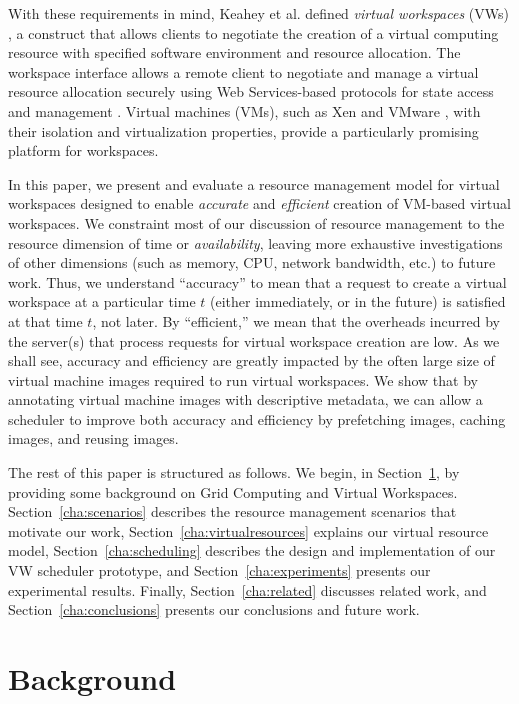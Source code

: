 \documentclass[singlespace]{ccw_chithesis}
\begin{document}
With these requirements in mind, Keahey et al. defined \emph{virtual workspaces} (VWs) \cite{VirtualWorkspaces05}, a construct that allows clients to negotiate the creation of a virtual computing resource with specified software environment and resource allocation. The workspace interface allows a remote client to negotiate and manage a virtual resource allocation securely using Web Services{}-based protocols for state access and management \cite{ModelingState05}. Virtual machines (VMs), such as Xen \cite{xen} and VMware \cite{vmwareweb}, with their isolation and virtualization properties, provide a
particularly promising platform for workspaces.

In this paper, we present and evaluate a resource management model for virtual workspaces designed to enable \emph{accurate} and \emph{efficient} creation of VM{}-based virtual workspaces. We constraint most of our discussion of resource management to the resource dimension of time or \emph{availability}, leaving more exhaustive investigations of other dimensions (such as memory, CPU, network bandwidth, etc.) to future work. Thus, we understand ``accuracy'' to mean that a request to create a virtual workspace at a particular time $t$ (either immediately, or in the future) is satisfied at that time $t$, not later. By ``efficient,'' we mean that the overheads incurred by the server(s) that process requests for virtual workspace creation are low. As we shall see, accuracy and efficiency are greatly impacted by the often large size of virtual machine images required to run virtual workspaces. We show that by annotating virtual machine images with descriptive metadata, we can allow a scheduler to improve both accuracy and efficiency by prefetching images, caching images, and reusing images.

The rest of this paper is structured as follows. We begin, in Section~\ref{cha:background}, by providing some background on Grid Computing and Virtual Workspaces. Section~\ref{cha:scenarios} describes the resource management scenarios
that motivate our work, Section~\ref{cha:virtualresources} explains our virtual resource model, Section~\ref{cha:scheduling} describes the design and implementation of our VW scheduler prototype, and Section~\ref{cha:experiments} presents our experimental results. Finally, Section~\ref{cha:related} discusses related work, and Section~\ref{cha:conclusions} presents our conclusions and future work.

\chapter{Background}
\label{cha:background}
\end{document}
